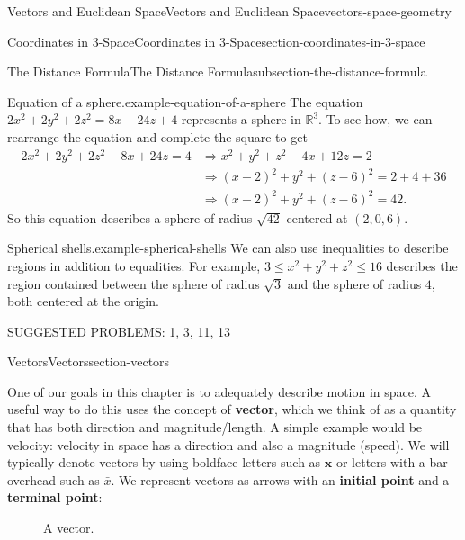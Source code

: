 \documentclass[oneside,10pt,]{book}
\newcommand{\terminology}[1]{\textbf{#1}}
\numberwithin{equation}{section}
\newcommand{\RR}{\mathbb{R}}
\newcommand{\vv}[1]{\mathbf{#1}}
\begin{document}
\begin{chapterptx}{Vectors and Euclidean Space}{}{Vectors and Euclidean Space}{}{}{vectors-space-geometry}
\begin{sectionptx}{Coordinates in 3-Space}{}{Coordinates in 3-Space}{}{}{section-coordinates-in-3-space}
\begin{subsectionptx}{The Distance Formula}{}{The Distance Formula}{}{}{subsection-the-distance-formula}
\begin{example}{Equation of a sphere.}{example-equation-of-a-sphere}
\hypertarget{p-1078}{}%
The equation \(2x^{2}+2y^{2}+2z^{2} = 8x - 24z + 4\) represents a sphere in \(\RR^{3}\). To see how, we can rearrange the equation and complete the square to get%
%
\begin{align*}
2x^{2}+2y^{2}+2z^{2} - 8x + 24z = 4 & \Rightarrow x^{2}+y^{2}+z^{2} - 4x + 12z = 2 \\
& \Rightarrow (x-2)^{2} + y^{2} + (z-6)^{2} = 2 + 4 + 36\\
& \Rightarrow (x-2)^{2} + y^{2} + (z-6)^{2} = 42.
\end{align*}
\hypertarget{p-1079}{}%
So this equation describes a sphere of radius \(\sqrt{42}\) centered at \((2,0,6)\).%
\end{example}
\begin{example}{Spherical shells.}{example-spherical-shells}%
\hypertarget{p-1080}{}%
We can also use inequalities to describe regions in addition to equalities. For example, \(3\leq x^{2}+y^{2}+z^{2}\leq 16\) describes the region contained between the sphere of radius \(\sqrt{3}\) and the sphere of radius \(4\), both centered at the origin.%
\end{example}
\hypertarget{p-1081}{}%
SUGGESTED PROBLEMS: 1, 3, 11, 13%
\end{subsectionptx}
\end{sectionptx}
%
%
\typeout{************************************************}
\typeout{************************************************}
%
\begin{sectionptx}{Vectors}{}{Vectors}{}{}{section-vectors}
\begin{introduction}{}%
\hypertarget{p-1082}{}%
One of our goals in this chapter is to adequately describe motion in space. A useful way to do this uses the concept of \terminology{vector}, which we think of as a quantity that has both direction and magnitude\slash{}length. A simple example would be velocity: velocity in space has a direction and also a magnitude (speed). We will typically denote vectors by using boldface letters such as \(\vv{x}\) or letters with a bar overhead such as \(\bar{x}\). We represent vectors as arrows with an \terminology{initial point} and a \terminology{terminal point}:%
\begin{figure}
\centering
{
}
\caption{A vector.\label{figure-vector-representation}}
\end{figure}

\end{introduction}
\end{sectionptx}
\end{chapterptx}
\end{document}
